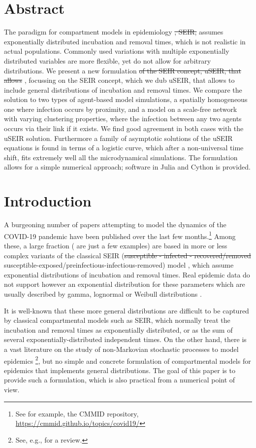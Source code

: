 \documentclass[10pt,letterpaper]{article}
\newcommand{\mychange}[2]{\textcolor[rgb]{0.75,0,0}{\st{#1} {#2}}}
\begin{document}
\section*{Abstract}
The paradigm for compartment models in epidemiology \mychange{, SEIR,}{} assumes exponentially distributed incubation and removal times, which is not realistic in actual populations. Commonly used variations with multiple exponentially distributed variables are more flexible, yet do not allow for arbitrary distributions.  We present a new formulation
\mychange{of the SEIR concept, uSEIR, that allows}{, focussing on the SEIR concept, which we dub uSEIR, that allows} to include general distributions of incubation and removal times. We compare the solution to two types of agent-based model simulations, a spatially homogeneous one where infection occurs by proximity, and a model on a scale-free network with varying clustering properties, where the infection between any two agents occurs via their link if it exists. We find good agreement in both cases with the uSEIR solution. Furthermore a family of asymptotic solutions of the uSEIR equations is found in terms of a logistic curve, which after a non-universal time shift, fits extremely well all the microdynamical simulations.  The formulation allows for a simple numerical approach;  software in Julia and Cython is provided.


\section*{Introduction}

A burgeoning number of papers attempting to model the dynamics of the COVID-19 pandemic have been published over the last few months.\footnote{See for example, the CMMID repository, \url{https://cmmid.github.io/topics/covid19/}} Among these, a large fraction (\cite{Tang2020, Lin2020, Lopez2020} are just a few examples) are based in more or less complex variants of the classical SEIR (\mychange{susceptible - infected - recovered/removed}{susceptible-exposed/preinfectious-infectious-removed}) model \cite{Hethcote2000}, which 
assume exponential distributions of incubation and removal times. Real epidemic data do not support however an exponential distribution for these parameters which are usually described by gamma, lognormal or Weibull distributions \cite{Zhang2020, Hellewell2020}.

{It is well-known that these more general distributions are difficult to be captured by
classical compartmental models such as SEIR, which normally treat the incubation and removal times as exponentially
distributed, or as the sum of several exponentially-distributed independent times. On the other hand, there is a vast
literature on the study of non-Markovian stochastic processes to model epidemics \footnote{See, e.g., \cite{stocrev} for a review.}, but 
no simple and concrete formulation of compartmental models for epidemics that
implements general distributions. The goal of this paper is to provide such a formulation, which is also practical from a numerical point of view.}
\end{document}
